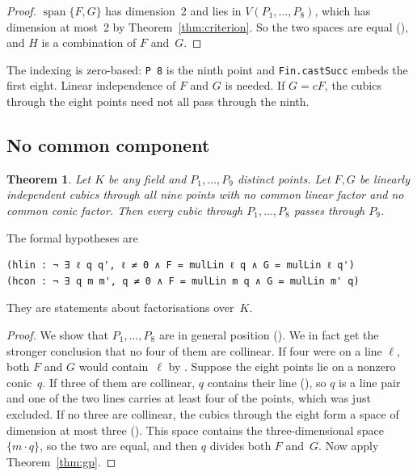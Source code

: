 \documentclass[11pt]{article}
\newtheorem{theorem}{Theorem}
\theoremstyle{definition}
\theoremstyle{remark}
\newcommand{\lean}[1]{\texttt{#1}}
\begin{document}
\begin{proof}
$\operatorname{span}\{F,G\}$ has dimension~2 and lies in $V(P_1,\dots,P_8)$, which has dimension
at most~2 by Theorem~\ref{thm:criterion}. So the two spaces are equal
(), and $H$ is a combination of $F$ and~$G$.
\end{proof}

The indexing is zero-based: \lean{P 8} is the ninth point and \lean{Fin.castSucc} embeds the
first eight. Linear independence of $F$ and $G$ is needed. If $G=cF$, the cubics through the eight
points need not all pass through the ninth.

\subsection{No common component}

\begin{theorem}\label{thm:ncf}
Let $K$ be any field and $P_1,\dots,P_9$ distinct points. Let $F,G$ be linearly independent
cubics through all nine points with no common linear factor and no common conic factor. Then
every cubic through $P_1,\dots,P_8$ passes through $P_9$.
\end{theorem}

The formal hypotheses are
\begin{lstlisting}
(hlin : ¬ ∃ ℓ q q', ℓ ≠ 0 ∧ F = mulLin ℓ q ∧ G = mulLin ℓ q')
(hcon : ¬ ∃ q m m', q ≠ 0 ∧ F = mulLin m q ∧ G = mulLin m' q)
\end{lstlisting}
They are statements about factorisations over~$K$.

\begin{proof}
We show that $P_1,\dots,P_8$ are in general position ().
We in fact get the stronger conclusion that no four of them are collinear. If four were on a line
$\ell$, both $F$ and $G$ would contain~$\ell$ by . Suppose the eight points lie
on a nonzero conic~$q$. If three of them are collinear, $q$ contains their line
(), so $q$ is a line pair and one of the two lines carries at least four of the
points, which was just excluded. If no three are collinear, the cubics through the eight form a
space of dimension at most three (). This space contains the
three-dimensional space $\{m\cdot q\}$, so the two are equal, and then $q$ divides both $F$ and~$G$.
Now apply Theorem~\ref{thm:gp}.
\end{proof}
\end{document}
